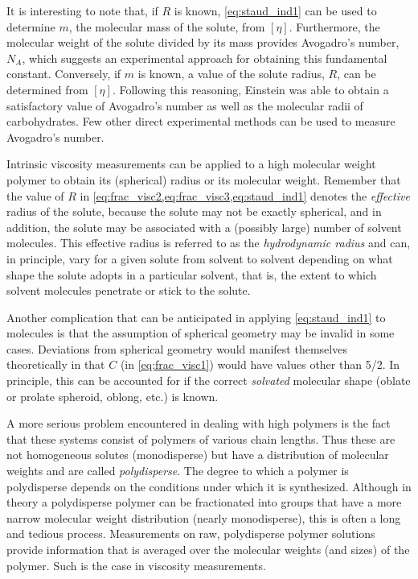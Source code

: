 \documentclass[nobib,nofonts,nols,nohyper]{tufte-handout}
\begin{document}
It is interesting to note that, if \( R \) is known, \cref{eq:staud_ind1} can be used to determine \( m \), the molecular mass of the solute, from \( [\eta] \). 
Furthermore, the molecular weight of the solute divided by its mass provides Avogadro's number, \( N_A \), which suggests an experimental approach for obtaining this fundamental constant. 
Conversely, if \( m \) is known, a value of the solute radius, \( R \), can be determined from \( [\eta] \). 
Following this reasoning, Einstein was able to obtain a satisfactory value of Avogadro's number as well as the molecular radii of carbohydrates. 
Few other direct experimental methods can be used to measure Avogadro's number.

Intrinsic viscosity measurements can be applied to a high molecular weight polymer to obtain its (spherical) radius or its molecular weight. 
Remember that the value of \( R \) in \cref{eq:frac_visc2,eq:frac_visc3,eq:staud_ind1} denotes the \emph{effective} radius of the solute, because the solute may not be exactly spherical, and in addition, the solute may be associated with a (possibly large) number of solvent molecules. 
This effective radius is referred to as the \emph{hydrodynamic radius} and can, in principle, vary for a given solute from solvent to solvent depending on what shape the solute adopts in a particular solvent, that is, the extent to which solvent molecules penetrate or stick to the solute.

Another complication that can be anticipated in applying \cref{eq:staud_ind1} to molecules is that the assumption of spherical geometry may be invalid in some cases. 
Deviations from spherical geometry would manifest themselves theoretically in that \( C \) (in \cref{eq:frac_visc1}) would have values other than \num{5/2}. 
In principle, this can be accounted for if the correct \emph{solvated} molecular shape (oblate or prolate spheroid, oblong, etc.) is known.

A more serious problem encountered in dealing with high polymers is the fact that these systems consist of polymers of various chain lengths. 
Thus these are not homogeneous solutes (monodisperse) but have a distribution of molecular weights and are called \emph{polydisperse}. 
The degree to which a polymer is polydisperse depends on the conditions under which it is synthesized. 
Although in theory a polydisperse polymer can be fractionated into groups that have a more narrow molecular weight distribution (nearly monodisperse), this is often a long and tedious process. 
Measurements on raw, polydisperse polymer solutions provide information that is averaged over the molecular weights (and sizes) of the polymer. 
Such is the case in viscosity measurements.
\end{document}
